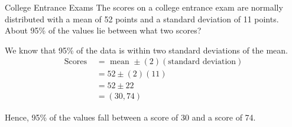 \begin{example}[https://www.youtube.com/watch?v=XcZCDQln9L0&list=PLfmpjsIzhzttL_Uec2nCbDRcAcUF7NKG8&index=23]{College Entrance Exams}
The scores on a college entrance exam are normally distributed with a mean of 52 points and a standard deviation of 11 points. About 95\% of the values lie between what two scores?

\sol
We know that 95\% of the data is within two standard deviations of the mean.\\
\begin{align*}
\textrm{Scores } &= \textrm{ mean } \pm (2)(\textrm{standard deviation})\\
&= 52 \pm (2)(11)\\
&= 52 \pm 22\\
&= \boxed{(30, 74)}
\end{align*}

Hence, 95\% of the values fall between a score of 30 and a score of 74.
\end{example}
\vfill
\text{}
\vfill
\pagebreak

